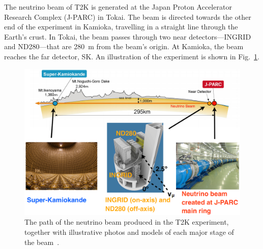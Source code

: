 \documentclass[aps,pra,12pt,notitlepage,tightenlines]{revtex4-1}
\begin{document}
The neutrino beam of T2K is generated at the Japan Proton Accelerator Research Complex (J-PARC) in Tokai. The beam is directed towards the other end of the experiment in Kamioka, travelling in a straight line through the Earth's crust. In Tokai, the beam passes through two near detectors---INGRID and ND280---that are 280~m from the beam's origin. At Kamioka, the beam reaches the far detector, SK. An illustration of the experiment is shown in Fig.\ \ref{fig:t2k}.
\begin{figure}
 \includegraphics[scale=0.33]{T2K_detail}
 \caption{The path of the neutrino beam produced in the T2K experiment, together with illustrative photos and models of each major stage of the beam~\cite{Jamieson:2015rza}.}
 \label{fig:t2k}
\end{figure}
\end{document}
